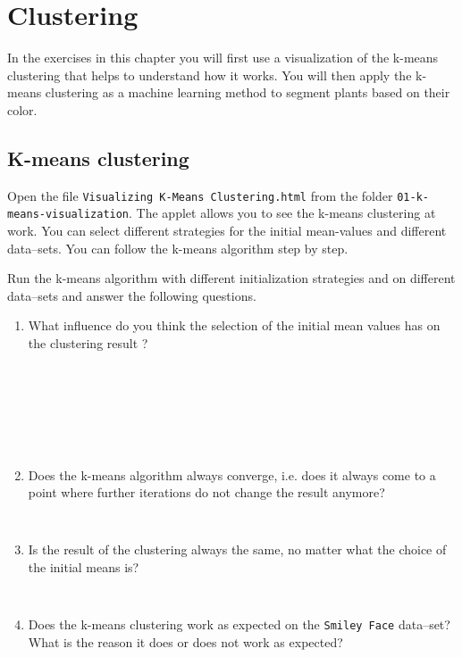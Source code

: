 \chapter{Clustering}

In the exercises in this chapter you will first use a visualization of the k-means clustering that helps to understand how it works. You will then apply the k-means clustering as a machine learning method to segment plants based on their color.

\section{K-means clustering}

Open the file {\tt Visualizing K-Means Clustering.html} from the folder {\tt 01-k-means-visualization}. The applet allows you to see the k-means clustering at work. You can select different strategies for the initial mean-values and different data--sets. You can follow the k-means algorithm step by step. 

Run the k-means algorithm with different initialization strategies and on different data--sets and answer the following questions.

\begin{enumerate}
\item What influence do you think the selection of the initial mean values has on the clustering result ?
\begin{verbatim}







\end{verbatim}
\item Does the k-means algorithm always converge, i.e. does it always come to a point where further iterations do not change the result anymore?
\begin{verbatim}


\end{verbatim}
\item Is the result of the clustering always the same, no matter what the choice of the initial means is?
\begin{verbatim}


\end{verbatim}
\item Does the k-means clustering work as expected on the {\tt Smiley Face} data--set? What is the reason it does or does not work as expected?
\begin{verbatim}









\end{verbatim}
\end{enumerate}

